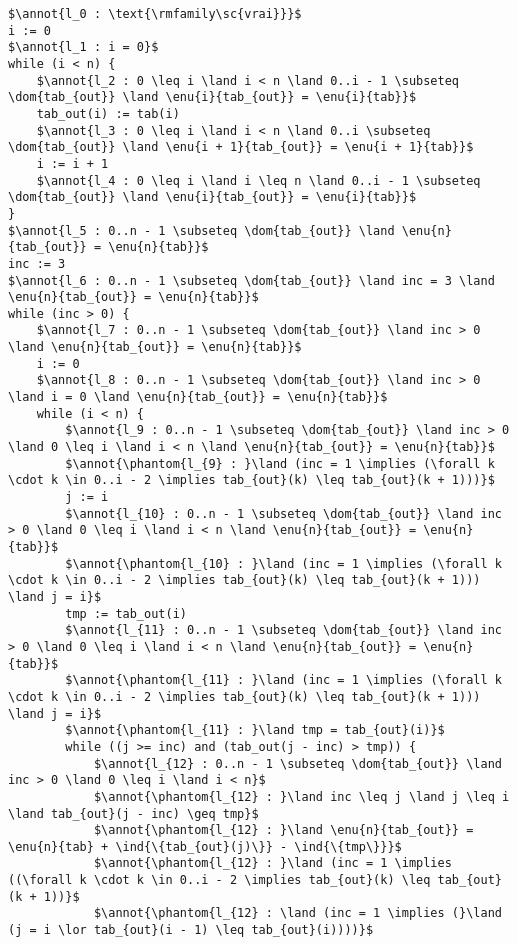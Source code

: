 \documentclass[a4paper, 11pt]{article}
\DeclareMathOperator{\eenu}{Enum}
\DeclareMathOperator{\ddom}{Dom}
\newcommand{\dom}[1]{\ddom\left(#1\right)}
\newcommand{\enu}[2]{\eenu_{\substack{#1}}\left(#2\right)}
\newcommand{\ind}[1]{\chi_{#1}}
\theoremstyle{mystyle}
\newcommand{\annot}[1]{{\color{black} #1}}
\begin{document}
\begin{lstlisting}[language=prooflang, mathescape,
    basicstyle=\ttfamily\large\color{blue!90!black},
    keywordstyle=\bfseries,
    tabsize=4]
$\annot{l_0 : \text{\rmfamily\sc{vrai}}}$
i := 0
$\annot{l_1 : i = 0}$
while (i < n) {
    $\annot{l_2 : 0 \leq i \land i < n \land 0..i - 1 \subseteq \dom{tab_{out}} \land \enu{i}{tab_{out}} = \enu{i}{tab}}$
    tab_out(i) := tab(i)
    $\annot{l_3 : 0 \leq i \land i < n \land 0..i \subseteq \dom{tab_{out}} \land \enu{i + 1}{tab_{out}} = \enu{i + 1}{tab}}$
    i := i + 1
    $\annot{l_4 : 0 \leq i \land i \leq n \land 0..i - 1 \subseteq \dom{tab_{out}} \land \enu{i}{tab_{out}} = \enu{i}{tab}}$
}
$\annot{l_5 : 0..n - 1 \subseteq \dom{tab_{out}} \land \enu{n}{tab_{out}} = \enu{n}{tab}}$
inc := 3
$\annot{l_6 : 0..n - 1 \subseteq \dom{tab_{out}} \land inc = 3 \land \enu{n}{tab_{out}} = \enu{n}{tab}}$
while (inc > 0) {
    $\annot{l_7 : 0..n - 1 \subseteq \dom{tab_{out}} \land inc > 0 \land \enu{n}{tab_{out}} = \enu{n}{tab}}$
    i := 0
    $\annot{l_8 : 0..n - 1 \subseteq \dom{tab_{out}} \land inc > 0 \land i = 0 \land \enu{n}{tab_{out}} = \enu{n}{tab}}$
    while (i < n) {
        $\annot{l_9 : 0..n - 1 \subseteq \dom{tab_{out}} \land inc > 0 \land 0 \leq i \land i < n \land \enu{n}{tab_{out}} = \enu{n}{tab}}$
        $\annot{\phantom{l_{9} : }\land (inc = 1 \implies (\forall k \cdot k \in 0..i - 2 \implies tab_{out}(k) \leq tab_{out}(k + 1)))}$
        j := i
        $\annot{l_{10} : 0..n - 1 \subseteq \dom{tab_{out}} \land inc > 0 \land 0 \leq i \land i < n \land \enu{n}{tab_{out}} = \enu{n}{tab}}$
        $\annot{\phantom{l_{10} : }\land (inc = 1 \implies (\forall k \cdot k \in 0..i - 2 \implies tab_{out}(k) \leq tab_{out}(k + 1))) \land j = i}$
        tmp := tab_out(i)
        $\annot{l_{11} : 0..n - 1 \subseteq \dom{tab_{out}} \land inc > 0 \land 0 \leq i \land i < n \land \enu{n}{tab_{out}} = \enu{n}{tab}}$
        $\annot{\phantom{l_{11} : }\land (inc = 1 \implies (\forall k \cdot k \in 0..i - 2 \implies tab_{out}(k) \leq tab_{out}(k + 1))) \land j = i}$
        $\annot{\phantom{l_{11} : }\land tmp = tab_{out}(i)}$
        while ((j >= inc) and (tab_out(j - inc) > tmp)) {
            $\annot{l_{12} : 0..n - 1 \subseteq \dom{tab_{out}} \land inc > 0 \land 0 \leq i \land i < n}$
            $\annot{\phantom{l_{12} : }\land inc \leq j \land j \leq i \land tab_{out}(j - inc) \geq tmp}$
            $\annot{\phantom{l_{12} : }\land \enu{n}{tab_{out}} = \enu{n}{tab} + \ind{\{tab_{out}(j)\}} - \ind{\{tmp\}}}$
            $\annot{\phantom{l_{12} : }\land (inc = 1 \implies ((\forall k \cdot k \in 0..i - 2 \implies tab_{out}(k) \leq tab_{out}(k + 1))}$
            $\annot{\phantom{l_{12} : \land (inc = 1 \implies (}\land (j = i \lor tab_{out}(i - 1) \leq tab_{out}(i))))}$

\end{lstlisting}
\end{document}

